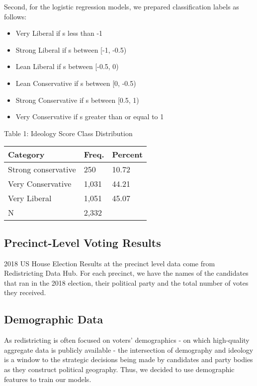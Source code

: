 \documentclass{article}
\begin{document}
\begin{itemize}
Second, for the logistic regression models, we prepared classification labels as follows:

\begin{itemize}
    \item Very Liberal if s less than -1
    \item Strong Liberal if s between [-1, -0.5)
    \item Lean Liberal if s between [-0.5, 0)
    \item Lean Conservative if s between [0, -0.5)
    \item Strong Conservative if s between [0.5, 1)
    \item Very Conservative if s greater than or equal to 1
\end{itemize}

Table 1: Ideology Score Class Distribution
\begin{table}[h]
    \begin{tabular}{lll}
    \hline
    Category            & Freq. & Percent \\
    \hline
    Strong conservative & 250   & 10.72   \\
    Very Conservative   & 1,031 & 44.21   \\
    Very Liberal        & 1,051 & 45.07   \\
    \hline
    N                   & 2,332 &    
    \end{tabular}
\end{table}



\subsection{Precinct-Level Voting Results}


2018 US House Election Results at the precinct level data come from Redistricting Data Hub. 
For each precinct, we have the names of the candidates that ran in the 2018 election, 
their political party and the total number of votes they received.



\subsection{Demographic Data}


As redistricting is often focused on voters’ demographics - on which high-quality aggregate data is publicly available -  the intersection of demography and ideology is a window to the strategic decisions being made by candidates and party bodies as they construct political geography. Thus, we decided to use demographic features to train our models.


\end{itemize}
\end{document}
